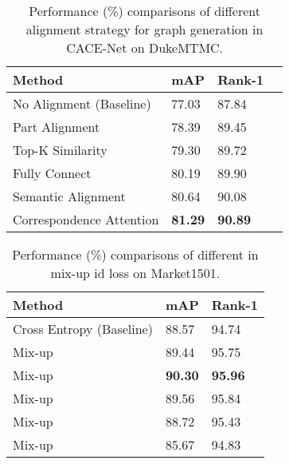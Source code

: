 \documentclass[final]{cvpr}
\begin{document}
\begin{table}[t]
\centering
\footnotesize
\caption{Performance (\%) comparisons of different alignment strategy for graph generation in CACE-Net on DukeMTMC.} 
\label{table_alignment}
\begin{tabular}{llll}
\hline
Method  &mAP&Rank-1\\ \hline
No Alignment (Baseline) & 77.03 & 87.84 \\
Part Alignment & 78.39 & 89.45 \\
Top-K Similarity & 79.30 & 89.72\\
Fully Connect & 80.19 & 89.90 \\
Semantic Alignment & 80.64 & 90.08\\
Correspondence Attention  &\textbf{81.29} & \textbf{90.89} \\
\hline
\end{tabular}
\end{table}

\begin{table}[t]
\footnotesize
\centering
\caption{Performance (\%) comparisons of different  in  mix-up id loss on Market1501.} 
\label{table_mixup}
\begin{tabular}{lll}
\hline
Method &mAP&Rank-1\\
\hline
Cross Entropy (Baseline) & 88.57 & 94.74 \\ Mix-up   & 89.44 & 95.75 \\ Mix-up   & \textbf{90.30} & \textbf{95.96} \\ Mix-up   & 89.56 & 95.84 \\ Mix-up   & 88.72 & 95.43 \\ Mix-up   & 85.67 & 94.83 \\ \hline
\end{tabular}
\end{table}
\end{document}
